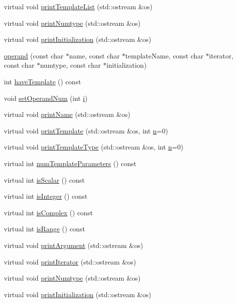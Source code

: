 \begin{DoxyCompactItemize}
\item 
virtual void \hyperlink{classoperand_a4167b1b58ac7ac53a857f5ebe8aed4b5}{print\+Template\+List} (std\+::ostream \&os)
\item 
virtual void \hyperlink{classoperand_a1d3316b8c2df5057b027c4b37923ccad}{print\+Numtype} (std\+::ostream \&os)
\item 
virtual void \hyperlink{classoperand_aed199d074c3cf0fd732eb0ae02cecbfc}{print\+Initialization} (std\+::ostream \&os)
\item 
\hyperlink{classoperand_ae9f2789d0609256855513169dce012d6}{operand} (const char $\ast$name, const char $\ast$template\+Name, const char $\ast$iterator, const char $\ast$numtype, const char $\ast$initialization)
\item 
int \hyperlink{classoperand_ad30b23c02bfe3f3b9185468d2cde00bc}{have\+Template} () const 
\item 
void \hyperlink{classoperand_a66ff35e04a35c55365cf3f66c91c35bc}{set\+Operand\+Num} (int \hyperlink{indexexpr_8h_aabd77643995707c185e95c8cb2782c81}{i})
\item 
virtual void \hyperlink{classoperand_a545a620f7480eda1870b682db31549c5}{print\+Name} (std\+::ostream \&os)
\item 
virtual void \hyperlink{classoperand_a7397afe3ce1eb390538f8067016e647a}{print\+Template} (std\+::ostream \&os, int \hyperlink{indexexpr_8h_ab427e2e2b4d6cec55fa088ea2a692ace}{n}=0)
\item 
virtual void \hyperlink{classoperand_ac115fcfedc902b68a278d5534194d10c}{print\+Template\+Type} (std\+::ostream \&os, int \hyperlink{indexexpr_8h_ab427e2e2b4d6cec55fa088ea2a692ace}{n}=0)
\item 
virtual int \hyperlink{classoperand_a91ff6c58f389af7fc8fc3369082ac4f3}{num\+Template\+Parameters} () const 
\item 
virtual int \hyperlink{classoperand_a9e65861efe7c442d2f032baa3840d13f}{is\+Scalar} () const 
\item 
virtual int \hyperlink{classoperand_aa81da7b3d80163c272f5fc7f3b6add41}{is\+Integer} () const 
\item 
virtual int \hyperlink{classoperand_af0f978cfd828f6636146f28553f82cc9}{is\+Complex} () const 
\item 
virtual int \hyperlink{classoperand_a7ae257ace8e03d854ba5bad78fda1600}{is\+Range} () const 
\item 
virtual void \hyperlink{classoperand_a99d1c405e77755f64774c283aace308c}{print\+Argument} (std\+::ostream \&os)
\item 
virtual void \hyperlink{classoperand_ab378b65a23f67d3d3d7036e8ad749e3e}{print\+Iterator} (std\+::ostream \&os)
\item 
virtual void \hyperlink{classoperand_a1d3316b8c2df5057b027c4b37923ccad}{print\+Numtype} (std\+::ostream \&os)
\item 
virtual void \hyperlink{classoperand_aed199d074c3cf0fd732eb0ae02cecbfc}{print\+Initialization} (std\+::ostream \&os)
\end{DoxyCompactItemize}

